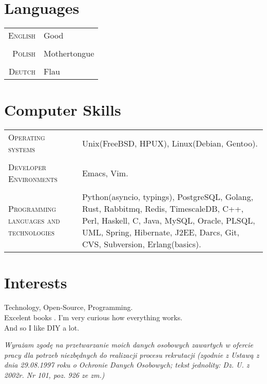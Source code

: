 \documentclass[a4paper,9pt]{article} %
\begin{document}

\section{Languages}

\begin{tabular}{r|l}
\textsc{English} & Good\\
\multicolumn{2}{c}{} \\
\textsc{Polish} & Mothertongue\\
\multicolumn{2}{c}{} \\
\textsc{Deutch} & Flau\\
\end{tabular}


\section{Computer Skills}

\begin{tabular}{K | L}
\textsc{Operating systems} & Unix(FreeBSD, HPUX), Linux(Debian, Gentoo).\\
 \\
\textsc{Developer Environments} & Emacs, Vim.\\
 \\
\textsc{Programming languages and technologies} & Python(asyncio, typings), PostgreSQL,
Golang, Rust, Rabbitmq, Redis, TimescaleDB, C++, Perl, Haskell, C, Java, MySQL, Oracle, PLSQL, UML, Spring, Hibernate, J2EE, Darcs, Git, CVS, Subversion, Erlang(basics).\\
\end{tabular}

\section{Interests}

Technology, Open-Source, Programming.\\
Excelent books . I’m very curious how everything works.\\
And so I like DIY a lot.


\vspace*{3\baselineskip}


\textit{\small{Wyrażam zgodę na przetwarzanie moich danych osobowych zawartych w ofercie pracy dla potrzeb niezbędnych do realizacji procesu rekrutacji (zgodnie z Ustawą z dnia 29.08.1997 roku o Ochronie Danych Osobowych; tekst jednolity: Dz. U. z 2002r. Nr 101, poz. 926 ze zm.)}}
\end{document}
